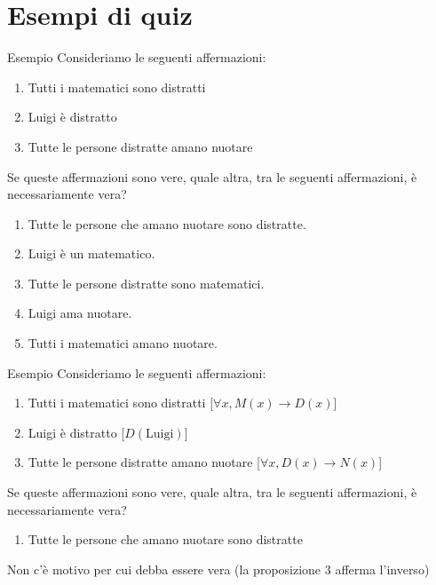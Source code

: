 \documentclass[aspectratio=169,10pt]{beamer}
\newcommand{\xmark}{{\color{red}{\ding{55}}}}
\begin{document}
\section{Esempi di quiz}

\begin{frame}{Esempio}
 Consideriamo le seguenti affermazioni:
 \begin{enumerate}
\item Tutti i matematici sono distratti 
\item Luigi è distratto 
\item Tutte le persone distratte amano nuotare 
\end{enumerate}
Se queste affermazioni sono vere, quale altra, tra le seguenti affermazioni, è necessariamente vera?
\begin{enumerate}[A]
\item Tutte le persone che amano nuotare sono distratte.
\item Luigi è un matematico.
\item Tutte le persone distratte sono matematici.
\item Luigi ama nuotare.
\item Tutti i matematici amano nuotare.
\end{enumerate}
\end{frame}

\begin{frame}{Esempio}
 Consideriamo le seguenti affermazioni:
 \begin{enumerate}
\item Tutti i matematici sono distratti [\alert{$\forall x, M(x) \to D(x)$}]
\item Luigi è distratto [\alert{$D(\text{Luigi})$}]
\item Tutte le persone distratte amano nuotare [\alert{$\forall x, D(x) \to N(x)$}]
\end{enumerate}
Se queste affermazioni sono vere, quale altra, tra le seguenti affermazioni, è necessariamente vera?
\begin{enumerate}[A]
\item Tutte le persone che amano nuotare sono distratte  \only<3>{(\xmark)}
\end{enumerate}
\pause
\medskip
Non c'è motivo per cui debba essere vera (la proposizione $3$ afferma l'inverso)
\end{frame}
\end{document}
